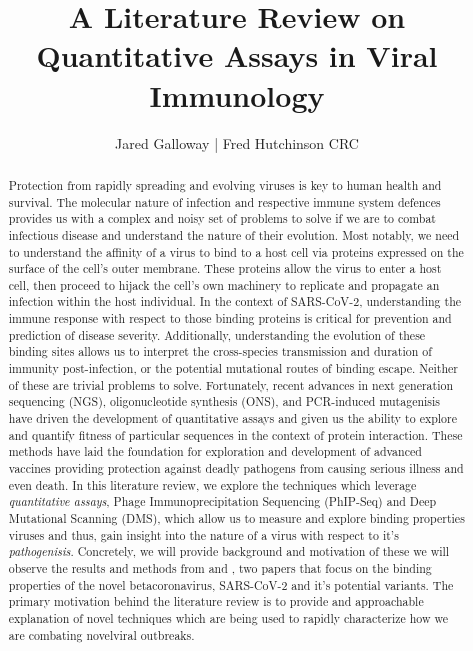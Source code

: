 \documentclass{article}
\title{A Literature Review on Quantitative Assays in Viral Immunology}
\author{Jared Galloway | Fred Hutchinson CRC}
\begin{document}
\maketitle

\begin{abstract}
Protection from rapidly spreading and evolving viruses is key to human health and survival.
The molecular nature of infection and respective immune system defences provides us with a complex and noisy set of problems to solve if we are to combat infectious disease and understand the nature of their evolution.
Most notably, we need to understand the affinity of a virus to bind to a host cell via proteins expressed on the surface of the cell's outer membrane.
These proteins allow the virus to enter a host cell, then proceed to hijack the cell's own machinery to replicate and propagate an infection within the host individual.
In the context of SARS-CoV-2, understanding the immune response with respect to those binding proteins is critical for prevention and prediction of disease severity.
Additionally, understanding the evolution of these binding sites allows us to interpret the cross-species transmission
and duration of immunity post-infection, or the potential mutational routes of binding escape.
Neither of these are trivial problems to solve. 
Fortunately, recent advances in next generation sequencing (NGS), oligonucleotide synthesis (ONS), and PCR-induced mutagenisis have driven the development of quantitative assays and given us the ability to explore and quantify fitness of particular sequences in the context of protein interaction.
These methods have laid the foundation for exploration and development of advanced vaccines providing protection against deadly pathogens from causing serious illness and even death.
In this literature review, we explore the techniques which leverage \textit{quantitative assays}, Phage Immunoprecipitation Sequencing (PhIP-Seq) and Deep Mutational Scanning (DMS), which allow us to measure and explore binding properties viruses and thus, gain insight into the nature of a virus with respect to it's \textit{pathogenisis}.
Concretely, we will provide background and motivation of these  we will observe the results and methods from \citet{Shrock2020} and \citet{Starr2020}, 
two papers that focus on the binding properties of the novel betacoronavirus, SARS-CoV-2 and it's potential variants.
The primary motivation behind the literature review is to provide and approachable explanation of novel techniques which are being used to rapidly characterize how we are combating novelviral outbreaks.
\end{abstract}
\end{document}
